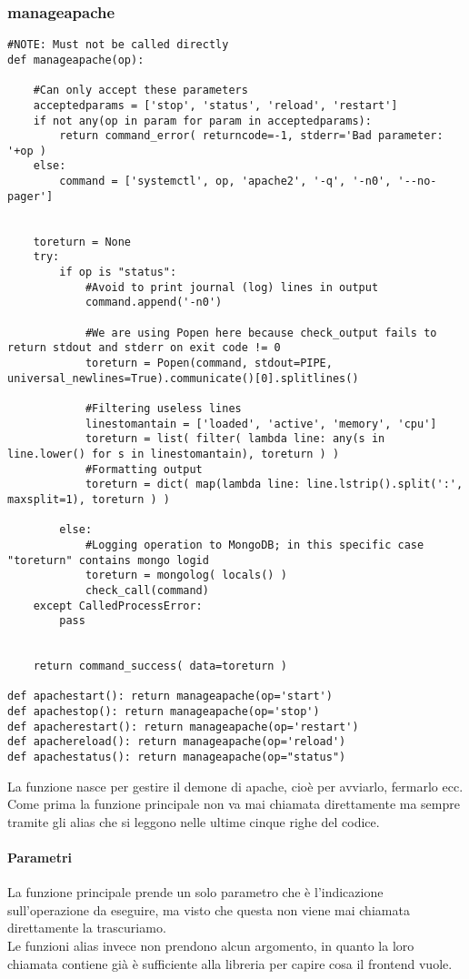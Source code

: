 \documentclass[11pt]{article}
\begin{document}
\subsubsection{manageapache}\label{manageapache}
\begin{lstlisting}
#NOTE: Must not be called directly
def manageapache(op):
    
    #Can only accept these parameters
    acceptedparams = ['stop', 'status', 'reload', 'restart']
    if not any(op in param for param in acceptedparams):
        return command_error( returncode=-1, stderr='Bad parameter: '+op )
    else:
        command = ['systemctl', op, 'apache2', '-q', '-n0', '--no-pager']


    toreturn = None
    try:
        if op is "status":
            #Avoid to print journal (log) lines in output
            command.append('-n0')

            #We are using Popen here because check_output fails to return stdout and stderr on exit code != 0
            toreturn = Popen(command, stdout=PIPE, universal_newlines=True).communicate()[0].splitlines()

            #Filtering useless lines
            linestomantain = ['loaded', 'active', 'memory', 'cpu']
            toreturn = list( filter( lambda line: any(s in line.lower() for s in linestomantain), toreturn ) )
            #Formatting output
            toreturn = dict( map(lambda line: line.lstrip().split(':', maxsplit=1), toreturn ) )

        else:
            #Logging operation to MongoDB; in this specific case "toreturn" contains mongo logid
            toreturn = mongolog( locals() )
            check_call(command)
    except CalledProcessError:
        pass


    return command_success( data=toreturn )

def apachestart(): return manageapache(op='start')
def apachestop(): return manageapache(op='stop')
def apacherestart(): return manageapache(op='restart')
def apachereload(): return manageapache(op='reload')
def apachestatus(): return manageapache(op="status")
\end{lstlisting}
La funzione nasce per gestire il demone di apache, cioè per avviarlo, fermarlo ecc. Come prima la funzione principale non va
mai chiamata direttamente ma sempre tramite gli alias che si leggono nelle ultime cinque righe del codice.
\paragraph{Parametri}
La funzione principale prende un solo parametro che è l'indicazione sull'operazione da eseguire, ma visto che questa non viene
mai chiamata direttamente la trascuriamo.\\
Le funzioni alias invece non prendono alcun argomento, in quanto la loro chiamata contiene già è sufficiente alla libreria
per capire cosa il frontend vuole.
\end{document}

